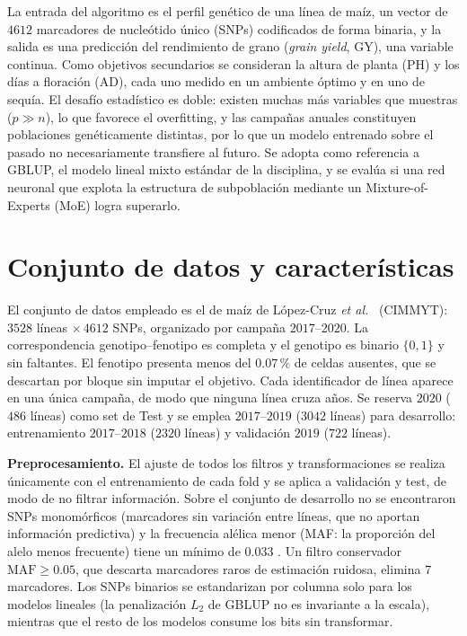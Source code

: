 \documentclass[conference]{IEEEtran}
\begin{document}
La entrada del algoritmo es el perfil genético de una línea de maíz, un vector de $4612$ marcadores de nucleótido único (SNPs) codificados de forma binaria, y la salida es una predicción del rendimiento de grano (\textit{grain yield}, GY), una variable continua. Como objetivos secundarios se consideran la altura de planta (PH) y los días a floración (AD), cada uno medido en un ambiente óptimo y en uno de sequía. El desafío estadístico es doble: existen muchas más variables que muestras ($p\gg n$), lo que favorece el overfitting, y las campañas anuales constituyen poblaciones genéticamente distintas, por lo que un modelo entrenado sobre el pasado no necesariamente transfiere al futuro. Se adopta como referencia a GBLUP, el modelo lineal mixto estándar de la disciplina, y se evalúa si una red neuronal que explota la estructura de subpoblación mediante un Mixture-of-Experts (MoE) logra superarlo.

\section{Conjunto de datos y características}
El conjunto de datos empleado es el de maíz de López-Cruz \textit{et al.}\ \cite{lopezcruz2021} (CIMMYT): $3528$ líneas $\times\,4612$ SNPs, organizado por campaña $2017$--$2020$. La correspondencia genotipo--fenotipo es completa y el genotipo es binario $\{0,1\}$ y sin faltantes. El fenotipo presenta menos del $0.07\,\%$ de celdas ausentes, que se descartan por bloque sin imputar el objetivo. Cada identificador de línea aparece en una única campaña, de modo que ninguna línea cruza años. Se reserva $2020$ ($486$ líneas) como set de Test  y se emplea $2017$--$2019$ ($3042$ líneas) para desarrollo: entrenamiento $2017$--$2018$ ($2320$ líneas) y validación $2019$ ($722$ líneas).

\textbf{Preprocesamiento.} El ajuste de todos los filtros y transformaciones se realiza únicamente con el entrenamiento de cada fold y se aplica a validación y test, de modo de no filtrar información. Sobre el conjunto de desarrollo no se encontraron SNPs monomórficos (marcadores sin variación entre líneas, que no aportan información predictiva) y la frecuencia alélica menor (MAF: la proporción del alelo menos frecuente) tiene un mínimo de $0.033$ . Un filtro conservador $\text{MAF}\ge 0.05$, que descarta marcadores raros de estimación ruidosa, elimina $7$ marcadores. Los SNPs binarios se estandarizan por columna solo para los modelos lineales (la penalización $L_2$ de GBLUP no es invariante a la escala), mientras que el resto de los modelos consume los bits sin transformar.
\end{document}
